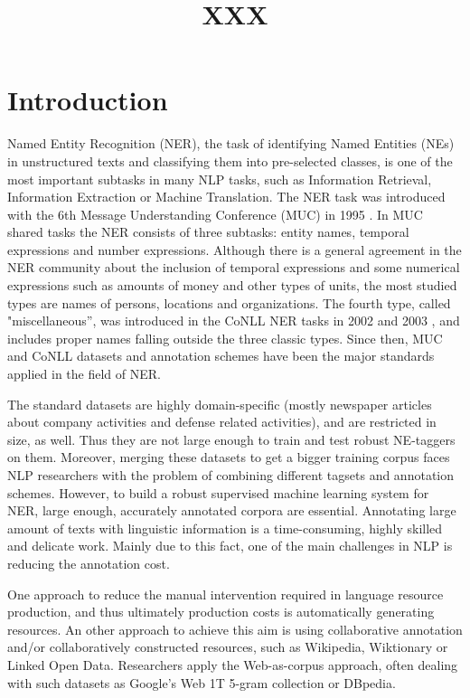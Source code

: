 \documentclass[11pt]{article}
\title{XXX}
\date{}
\begin{document}
\maketitle
\begin{abstract}
  
\end{abstract}

\section{Introduction}
\label{sec:intro}

Named Entity Recognition (NER), the task of identifying Named Entities (NEs) in unstructured texts and classifying them into pre-selected classes, is one of the most important subtasks in many NLP tasks, such as Information Retrieval, Information Extraction or Machine Translation. The NER task was introduced with the 6th Message Understanding Conference (MUC) in 1995 \cite{Grishman:96}. In MUC shared tasks the NER consists of three subtasks: entity names, temporal expressions and number expressions. Although there is a general agreement in the NER community about the inclusion of temporal expressions and some numerical expressions such as amounts of money and other types of units, the most studied types are names of persons, locations and organizations. The fourth type, called "miscellaneous'', was introduced in the CoNLL NER tasks in 2002 \cite{Tjong:02} and 2003 \cite{Tjong:03}, and includes proper names falling outside the three classic types. Since then, MUC and CoNLL datasets and annotation schemes have been the major standards applied in the field of NER. 

The standard datasets are highly domain-specific (mostly newspaper articles about company activities and defense related activities), and are restricted in size, as well. Thus they are not large enough to train and test robust NE-taggers on them. Moreover, merging these datasets to get a bigger training corpus faces NLP researchers with the problem of combining different tagsets and annotation schemes. However, to build a robust supervised machine learning system for NER, large enough, accurately annotated corpora are essential. Annotating large amount of texts with linguistic information is a time-consuming, highly skilled and delicate work. Mainly due to this fact, one of the main challenges in NLP is reducing the annotation cost. 

One approach to reduce the manual intervention required in language resource production, and thus ultimately production costs is automatically generating resources. An other approach to achieve this aim is using collaborative annotation and/or collaboratively constructed resources, such as Wikipedia, Wiktionary or Linked Open Data. Researchers apply the Web-as-corpus approach, often dealing with such datasets as Google's Web 1T 5-gram collection or DBpedia.  
\end{document}
